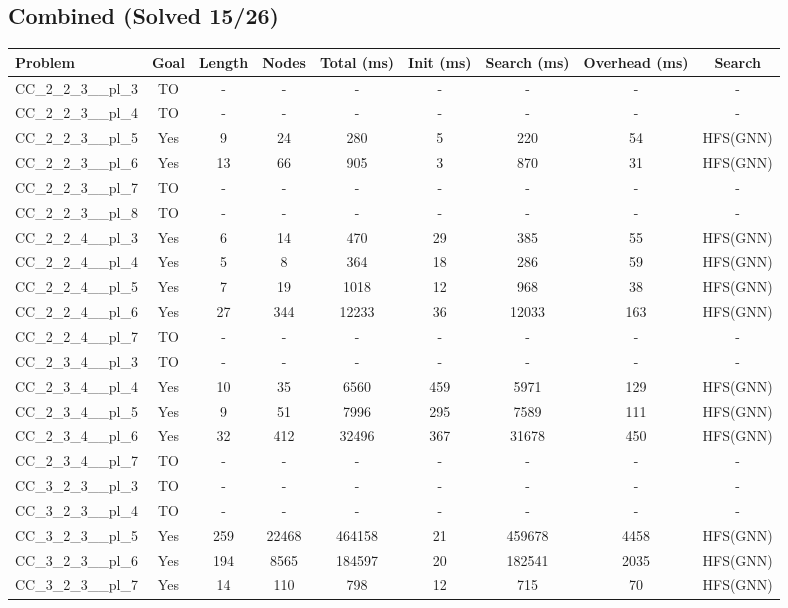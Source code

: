 \documentclass{article}
\begin{document}
\subsection*{Combined (Solved 15/26)}
\begin{tabular}{lcccccccc}
\toprule
Problem & Goal & Length & Nodes & Total (ms) & Init (ms) & Search (ms) & Overhead (ms) & Search \\
\midrule
CC\_2\_2\_3\_\_pl\_3 & TO & - & - & - & - & - & - & - \\
CC\_2\_2\_3\_\_pl\_4 & TO & - & - & - & - & - & - & - \\
CC\_2\_2\_3\_\_pl\_5 & Yes & 9 & 24 & 280 & 5 & 220 & 54 & HFS(GNN) \\
CC\_2\_2\_3\_\_pl\_6 & Yes & 13 & 66 & 905 & 3 & 870 & 31 & HFS(GNN) \\
CC\_2\_2\_3\_\_pl\_7 & TO & - & - & - & - & - & - & - \\
CC\_2\_2\_3\_\_pl\_8 & TO & - & - & - & - & - & - & - \\
CC\_2\_2\_4\_\_pl\_3 & Yes & 6 & 14 & 470 & 29 & 385 & 55 & HFS(GNN) \\
CC\_2\_2\_4\_\_pl\_4 & Yes & 5 & 8 & 364 & 18 & 286 & 59 & HFS(GNN) \\
CC\_2\_2\_4\_\_pl\_5 & Yes & 7 & 19 & 1018 & 12 & 968 & 38 & HFS(GNN) \\
CC\_2\_2\_4\_\_pl\_6 & Yes & 27 & 344 & 12233 & 36 & 12033 & 163 & HFS(GNN) \\
CC\_2\_2\_4\_\_pl\_7 & TO & - & - & - & - & - & - & - \\
CC\_2\_3\_4\_\_pl\_3 & TO & - & - & - & - & - & - & - \\
CC\_2\_3\_4\_\_pl\_4 & Yes & 10 & 35 & 6560 & 459 & 5971 & 129 & HFS(GNN) \\
CC\_2\_3\_4\_\_pl\_5 & Yes & 9 & 51 & 7996 & 295 & 7589 & 111 & HFS(GNN) \\
CC\_2\_3\_4\_\_pl\_6 & Yes & 32 & 412 & 32496 & 367 & 31678 & 450 & HFS(GNN) \\
CC\_2\_3\_4\_\_pl\_7 & TO & - & - & - & - & - & - & - \\
CC\_3\_2\_3\_\_pl\_3 & TO & - & - & - & - & - & - & - \\
CC\_3\_2\_3\_\_pl\_4 & TO & - & - & - & - & - & - & - \\
CC\_3\_2\_3\_\_pl\_5 & Yes & 259 & 22468 & 464158 & 21 & 459678 & 4458 & HFS(GNN) \\
CC\_3\_2\_3\_\_pl\_6 & Yes & 194 & 8565 & 184597 & 20 & 182541 & 2035 & HFS(GNN) \\
CC\_3\_2\_3\_\_pl\_7 & Yes & 14 & 110 & 798 & 12 & 715 & 70 & HFS(GNN) \\

\end{tabular}
\end{document}
